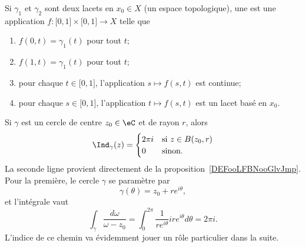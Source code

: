\begin{definition}  \label{DefECnFJQp}
	Si \( \gamma_1\) et \( \gamma_2\) sont deux lacets en \( x_0\in X\) (un espace topologique), une  est une application \( f\colon \mathopen[ 0 , 1 \mathclose]\times \mathopen[ 0 , 1 \mathclose]\to X\) telle que
	\begin{enumerate}
		\item
		      \( f(0,t)=\gamma_1(t)\) pour tout \( t\);
		\item
		      \( f(1,t)=\gamma_1(t)\) pour tout \( t\);
		\item
		      pour chaque \( t\in \mathopen[ 0 , 1 \mathclose]\), l'application \( s\mapsto f(s,t)\) est continue;
		\item
		      pour chaque \( s\in \mathopen[ 0 , 1 \mathclose]\), l'application \( t\mapsto f(s,t)\) est un lacet basé en \( x_0\).
	\end{enumerate}
\end{definition}

\begin{example} \label{ExradygL}
	Si \( \gamma\) est un cercle de centre \( z_0\in \eC\) et de rayon \( r\), alors
	\begin{equation}
		\Ind_{\gamma}(z)=\begin{cases}
			2\pi i & \text{si } z\in B(z_0,r) \\
			0      & \text{sinon}.
		\end{cases}
	\end{equation}
	La seconde ligne provient directement de la proposition~\ref{DEFooLFBNooGlvJmp}. Pour la première, le cercle \( \gamma\) se paramètre par
	\begin{equation}
		\gamma(\theta)=z_0+r e^{i\theta},
	\end{equation}
	et l'intégrale vaut
	\begin{equation}
		\int_{\gamma}\frac{ d\omega }{ \omega-z_0 }=\int_0^{2\pi}\frac{1}{ r e^{i\theta} }ir e^{i\theta}d\theta=2\pi i.
	\end{equation}
	L'indice de ce chemin va évidemment jouer un rôle particulier dans la suite.
\end{example}

